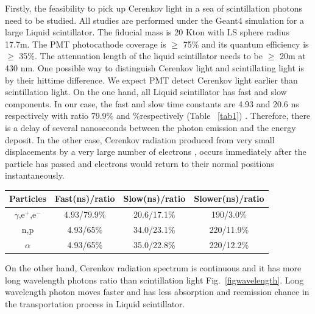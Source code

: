 \documentclass[a4paper,10pt]{cpc-hepnp}
\begin{document}
Firstly, the feasibility to pick up Cerenkov light in a sea of scintillation photons
need to be studied.
All studies are performed under the Geant4 simulation for a large Liquid
scintillator.
The fiducial mass is 20 Kton with LS sphere radius 17.7m.
The PMT photocathode coverage is $\ge$ 75\% and its
quantum efficiency is
$\ge$ 35\%. The attenuation length of the liquid scintillator needs to be $\ge$ 20m at 430 nm.
One possible way to distinguish Cerenkov light and scintillating light is by their hittime
difference\cite{lab2}. We expect PMT detect Cerenkov light earlier than scintillation light.
On the one hand, all Liquid scintillator has fast and slow components. In our
case, the fast and slow time constants are 4.93 and 20.6 ns respectively with
ratio  79.9\% and \%respectively (Table ~\ref{tab1}) .
Therefore, there is a delay of several nanoseconds between the photon emission and the energy deposit.
In the other case, Cerenkov radiation produced from very small displacements by a very large number of electrons
, occurs immediately after the particle has passed and electrons would return to their normal positions
 instantaneously\cite{special_article}.
\begin{center}
\footnotesize
\begin{tabular*}{100mm}{@{\extracolsep{\fill}}cccc}
\toprule Particles & Fast(ns)/ratio & Slow(ns)/ratio &Slower(ns)/ratio \\
\hline
$\gamma$,e$^+$,e$^-$&4.93/79.9\%&20.6/17.1\%&190/3.0\% \\
n,p&4.93/65\%&34.0/23.1\%&220/11.9\% \\
$\alpha$&4.93/65\%&35.0/22.8\%&220/12.2\%\\
\bottomrule
\end{tabular*}
\end{center}
On the other hand, Cerenkov radiation spectrum is continuous and it has more
long wavelength
photons ratio than scintillation light Fig.~\ref{figwavelength}. Long
wavelength photon moves faster and has less absorption
and reemission chance in the transportation process in Liquid scintillator.
\end{document}
